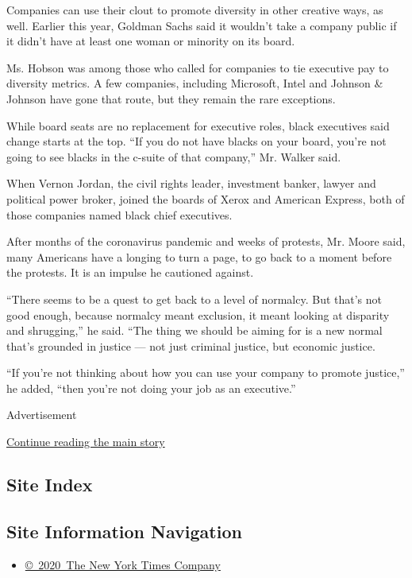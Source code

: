 Companies can use their clout to promote diversity in other creative
ways, as well. Earlier this year, Goldman Sachs said it wouldn't take a
company public if it didn't have at least one woman or minority on its
board.

Ms. Hobson was among those who called for companies to tie executive pay
to diversity metrics. A few companies, including Microsoft, Intel and
Johnson \& Johnson have gone that route, but they remain the rare
exceptions.

While board seats are no replacement for executive roles, black
executives said change starts at the top. ``If you do not have blacks on
your board, you're not going to see blacks in the c-suite of that
company,'' Mr. Walker said.

When Vernon Jordan, the civil rights leader, investment banker, lawyer
and political power broker, joined the boards of Xerox and American
Express, both of those companies named black chief executives.

After months of the coronavirus pandemic and weeks of protests, Mr.
Moore said, many Americans have a longing to turn a page, to go back to
a moment before the protests. It is an impulse he cautioned against.

``There seems to be a quest to get back to a level of normalcy. But
that's not good enough, because normalcy meant exclusion, it meant
looking at disparity and shrugging,'' he said. ``The thing we should be
aiming for is a new normal that's grounded in justice --- not just
criminal justice, but economic justice.

``If you're not thinking about how you can use your company to promote
justice,'' he added, ``then you're not doing your job as an executive.''

Advertisement

\protect\hyperlink{after-bottom}{Continue reading the main story}

\hypertarget{site-index}{%
\subsection{Site Index}\label{site-index}}

\hypertarget{site-information-navigation}{%
\subsection{Site Information
Navigation}\label{site-information-navigation}}

\begin{itemize}
\tightlist
\item
  \href{https://help.nytimes3xbfgragh.onion/hc/en-us/articles/115014792127-Copyright-notice}{©~2020~The
  New York Times Company}
\end{itemize}

